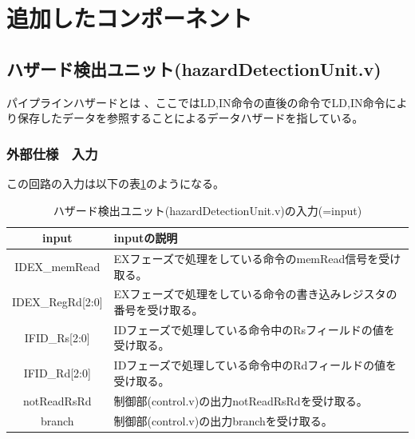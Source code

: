 \documentclass[a4j,titlepage]{jarticle}
\begin{document}


\newpage
\section{追加したコンポーネント}
\subsection{ハザード検出ユニット(hazardDetectionUnit.v)}
パイプラインハザードとは
、ここではLD,IN命令の直後の命令でLD,IN命令により保存したデータを参照することによるデータハザードを指している。

\subsubsection{外部仕様　入力}
この回路の入力は以下の表\ref{hazardDetectionUnitI}のようになる。
\begin{table}[H]
    \caption{ハザード検出ユニット(hazardDetectionUnit.v)の入力(=input)}
    \label{hazardDetectionUnitI}
    \begin{center}
    \begin {tabularx}{150mm}{|c|X|} \hline
         input & inputの説明 \\ \hline \hline
         IDEX\_memRead & EXフェーズで処理をしている命令のmemRead信号を受け取る。\\ \hline
         IDEX\_RegRd[2:0] & EXフェーズで処理をしている命令の書き込みレジスタの番号を受け取る。\\ \hline
         IFID\_Rs[2:0] & IDフェーズで処理している命令中のRsフィールドの値を受け取る。\\ \hline
         IFID\_Rd[2:0] & IDフェーズで処理している命令中のRdフィールドの値を受け取る。\\ \hline
         notReadRsRd & 制御部(control.v)の出力notReadRsRdを受け取る。\\ \hline
         branch & 制御部(control.v)の出力branchを受け取る。\\ \hline
    \end{tabularx}
    \end{center}
\end{table}
\end{document}
